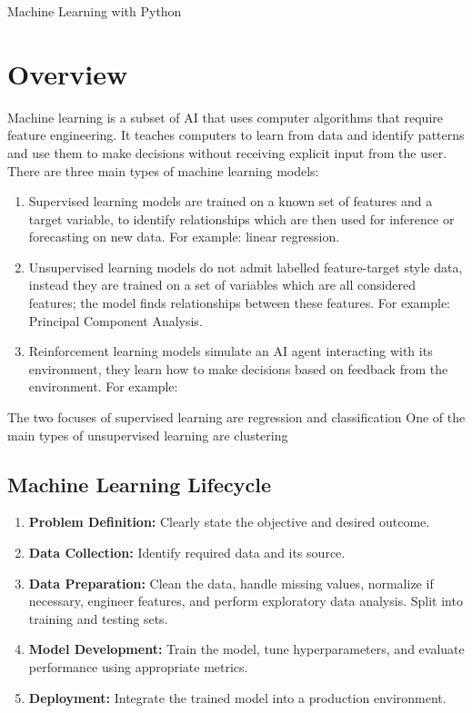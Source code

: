 \documentclass[9pt]{extarticle}
\begin{document}
\begin{titlepage}
    Machine Learning with Python 
\end{titlepage}
\tableofcontents
\newpage
\section{Overview}

Machine learning is a subset of AI that uses 
computer algorithms that require feature engineering.  It 
teaches computers to learn from data and identify patterns and use 
them to make decisions without receiving explicit input 
from the user. There are three main types of machine learning models:
\begin{enumerate}
    \item Supervised learning models are trained on a known 
set of features and a target variable, to identify 
relationships which are then used for inference or 
forecasting on new data. For example: linear regression. 
    \item Unsupervised learning 
    models do not admit labelled feature-target style data, instead 
    they are trained on a set of variables which are all 
    considered features; the model finds relationships between these features. For 
    example: Principal Component Analysis.
    \item Reinforcement learning models simulate an AI agent interacting 
with its environment, they learn how to make decisions based on 
feedback from the environment. For example:
\end{enumerate}


The two focuses of supervised learning are regression and classification
One of the main types of unsupervised learning are clustering

\subsection{Machine Learning Lifecycle}

\begin{enumerate}
    \item \textbf{Problem Definition:} Clearly state the objective and desired outcome.
    
    \item \textbf{Data Collection:} Identify required data and its source.
    
    \item \textbf{Data Preparation:} Clean the data, handle missing values, normalize if necessary, engineer features, and perform exploratory data analysis. Split into training and testing sets.
    
    \item \textbf{Model Development:} Train the model, tune hyperparameters, and evaluate performance using appropriate metrics.
    
    \item \textbf{Deployment:} Integrate the trained model into a production environment.
\end{enumerate}
\end{document}
